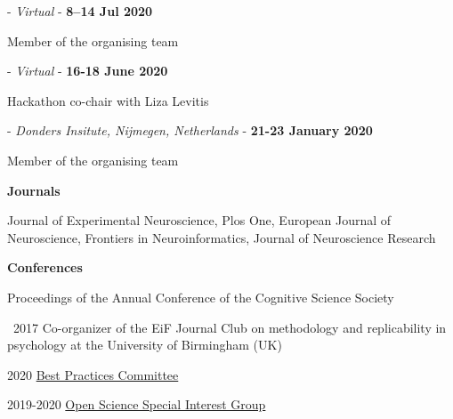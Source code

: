 
%
 - \textit{Virtual} - \textbf{8--14 Jul 2020}

Member of the organising team


%
 - \textit{Virtual} - \textbf{16-18 June 2020}

Hackathon co-chair with Liza Levitis


%
 - \textit{Donders Insitute, Nijmegen, Netherlands} - \textbf{21-23 January 2020}

Member of the organising team




\textbf{Journals}

Journal of Experimental Neuroscience, Plos One, European Journal of Neuroscience, Frontiers in Neuroinformatics, Journal of Neuroscience Research

\textbf{Conferences}

Proceedings of the Annual Conference of the Cognitive Science Society



\textbullet~2017 Co-organizer of the EiF Journal Club on methodology and replicability in psychology at the University of Birmingham (UK)




\begin{description}
    \item 2020 \href{https://www.humanbrainmapping.org/i4a/pages/index.cfm?pageid=4027}{Best Practices Committee}
    \item 2019-2020 \href{https://www.humanbrainmapping.org/i4a/pages/index.cfm?pageID=3712}{Open Science Special Interest Group} 
\end{description}


